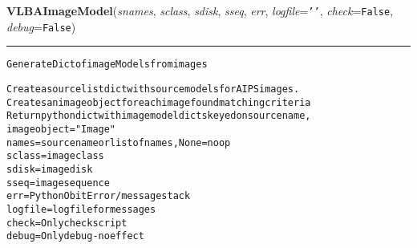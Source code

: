     \label{VLBACal:VLBAImageModel}
    \vspace{0.5ex}

    \begin{boxedminipage}{\textwidth}

    \raggedright \textbf{VLBAImageModel}(\textit{snames}, \textit{sclass}, \textit{sdisk}, \textit{sseq}, \textit{err}, \textit{logfile}=\texttt{'\-'\-}, \textit{check}=\texttt{F\-a\-l\-s\-e\-}, \textit{debug}=\texttt{F\-a\-l\-s\-e\-})

    \vspace{-1.5ex}

    \rule{\textwidth}{0.5\fboxrule}
\begin{alltt}
Generate Dict of image Models from images

Create a source list dict with source models for AIPS images.
Creates an image object for each image found matching criteria
Return python dict with image model dicts keyed on source name,
image object = "Image"
names      = source name or list of names, None=noop
sclass     = image class
sdisk      = image disk
sseq       = image sequence
err        = Python Obit Error/message stack
logfile    = logfile for messages
check      = Only check script
debug      = Only debug - no effect\end{alltt}

    \vspace{1ex}

    \end{boxedminipage}

    \label{VLBACal:VLBAImFITS}
    \vspace{0.5ex}

